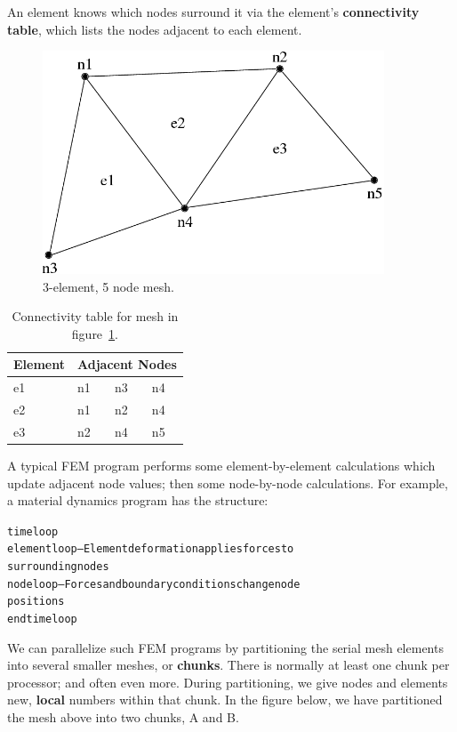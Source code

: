 \documentclass[10pt]{article}
\begin{document}
An element knows which nodes surround it via the element's
{\bf connectivity table}, which lists the nodes adjacent to each element.

\begin{figure}[h]
\begin{center}
\includegraphics[width=4in]{fig/simple_mesh}
\end{center}
\caption{3-element, 5 node mesh.}
\label{fig:simplemesh}
\end{figure}

\begin{table}[h]
\begin{center}
\begin{tabular}{||l||l|l|l||}\hline
Element & \multicolumn{3}{c||}{Adjacent Nodes} \\\hline
e1 & n1 & n3 & n4 \\
e2 & n1 & n2 & n4 \\
e3 & n2 & n4 & n5 \\
\hline
\end{tabular}
\end{center}
\caption{Connectivity table for mesh in figure~\ref{fig:simplemesh}.}
\label{table:simplemesh}
\end{table}

A typical FEM program performs some element-by-element calculations which
update adjacent node values; then some node-by-node calculations.  For
example, a material dynamics program has the structure:

\begin{alltt}
     time loop
          element loop-- Element deformation applies forces to
          surrounding nodes
          node loop-- Forces and boundary conditions change node
          positions
     end time loop
\end{alltt}

We can parallelize such FEM programs by partitioning the serial mesh
elements into several smaller meshes, or {\bf chunks}.  There is normally
at least one chunk per processor; and often even more.  During partitioning, 
we give nodes and elements new, {\bf local} numbers within that chunk.
In the figure below, we have partitioned the mesh above into two chunks, A and B.
\end{document}
